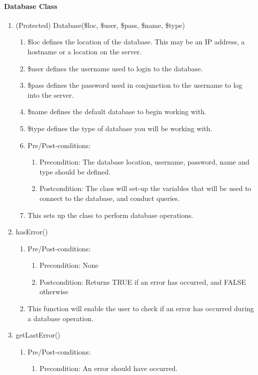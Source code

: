 \documentclass{article}
\begin{document}
\paragraph{Database Class}
\begin{enumerate}
\item (Protected) Database(\$loc, \$user, \$pass, \$name, \$type)
\begin{enumerate}
\item \$loc defines the location of the database. This may be an IP address, a hostname or a location on the server.
\item \$user defines the username used to login to the database.
\item \$pass defines the password used in conjunction to the username to log into the server.
\item \$name defines the default database to begin working with.
\item \$type defines the type of database you will be working with.
\item Pre/Post-conditions:
\begin{enumerate}
\item Precondition: The database location, username, password, name and type should be defined.
\item Postcondition: The class will set-up the variables that will be used to connect to the database, and conduct queries.
\end{enumerate}
\item This sets up the class to perform database operations.
\end{enumerate}
\item hasError()
\begin{enumerate}
\item Pre/Post-conditions:
\begin{enumerate}
\item Precondition: None
\item Postcondition: Returns TRUE if an error has occurred, and FALSE otherwise
\end{enumerate}
\item This function will enable the user to check if an error has occurred during a database operation.
\end{enumerate}
\item getLastError()
\begin{enumerate}
\item Pre/Post-conditions:
\begin{enumerate}
\item Precondition: An error should have occurred.

\end{enumerate}
\end{enumerate}
\end{enumerate}
\end{document}
